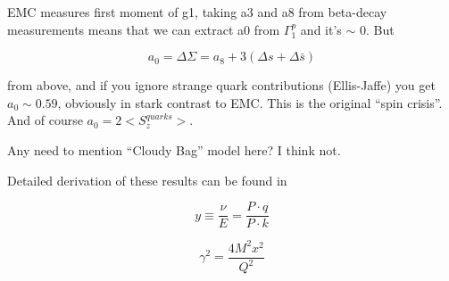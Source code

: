 EMC measures first moment of g1, taking a3 and a8 from beta-decay measurements means that we can extract a0 from $\Gamma_1^p$ and it's $\sim$ 0.  But

\begin{equation}
  a_0 = \Delta \Sigma = a_8 + 3(\Delta s + \Delta \bar{s})
\end{equation}

from above, and if you ignore strange quark contributions (Ellis-Jaffe) you get $a_0 \sim 0.59$, obviously in stark contrast to EMC.  This is the original ``spin crisis''.  And of course $a_0 = 2<S_z^{quarks}>$.

Any need to mention ``Cloudy Bag'' model here?  I think not.

Detailed derivation of these results can be found in \cite{Anselmino:1994gn}

\begin{equation}
  y \equiv \frac{\nu}{E} = \frac{P \cdot q}{P \cdot k}
\end{equation}

\begin{equation}
  \gamma^2 = \frac{4M^2x^2}{Q^2}
\end{equation}
